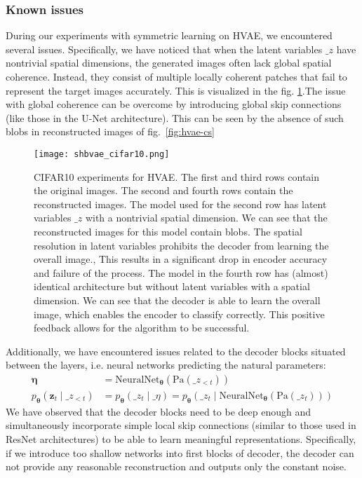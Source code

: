 \subsubsection*{Known issues}
During our experiments with symmetric learning on HVAE, we encountered several issues. Specifically, we have noticed that when the latent variables 
$\_z$ have nontrivial spatial dimensions, the generated images often lack global spatial coherence. Instead, they consist of multiple locally coherent 
patches that fail to represent the target images accurately. This is visualized in the fig. \ref{fig:cifar10-exp}.The issue with global coherence can be overcome by introducing global skip connections (like those in the U-Net architecture).
This can be seen by the absence of such blobs in reconstructed images of fig.~\ref{fig:hvae-cs}
\begin{figure}[b]
    \centering
    \texttt{[image: shbvae\_cifar10.png]}
    \caption[Issues with spatial coherence]{CIFAR10 experiments for HVAE. The first and third rows contain the original images. The second and fourth rows contain the reconstructed images.
    The model used for the second row has latent variables $\_z$ with a nontrivial spatial dimension. We can see that the reconstructed images for this model contain blobs. The spatial resolution 
    in latent variables prohibits the decoder from learning the overall image., This results in a significant drop in encoder accuracy and failure of the process.
    The model in the fourth row has (almost) identical architecture but without latent variables with a spatial dimension. We can see that the decoder is able to learn the overall image, which 
    enables the encoder to classify correctly. This positive feedback allows for the algorithm to be successful.}
    \label{fig:cifar10-exp}
\end{figure}


Additionally, we have encountered issues related to the decoder blocks situated between the layers, i.e. neural networks predicting the natural parameters:
\begin{align*}
    \boldsymbol{\eta} &= \mathrm{NeuralNet}_{\boldsymbol{\theta}}(\text{Pa}(\_z_{<t})) \\
    p_{\boldsymbol{\theta}}(\mathbf{z}_t \mid \_z_{<t}) &= p_{\boldsymbol{\theta}}(\_z_t \mid \_\eta) =  p_{\boldsymbol{\theta}}(\_z_t \mid \mathrm{NeuralNet}_{\boldsymbol{\theta}}(\text{Pa}(\_z_t)))
\end{align*}
We have observed that the decoder blocks need to be deep enough and simultaneously incorporate simple local skip connections 
(similar to those used in ResNet architectures) to be able to learn meaningful representations. Specifically, if we introduce too shallow networks into first blocks
of decoder, the decoder can not provide any reasonable reconstruction and outputs only the constant noise. 

